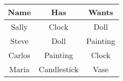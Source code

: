 \documentclass{article}
\begin{document}
\begin {tabular} {c c c}
Name & Has & Wants \\ \hline
Sally & Clock & Doll \\
Steve & Doll & Painting \\
Carlos & Painting & Clock \\
Maria & Candlestick & Vase \\ \hline
\end {tabular}
\end{document}

